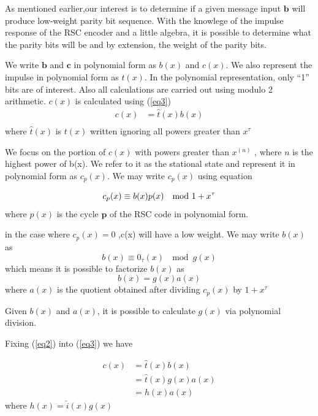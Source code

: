 \documentclass[conference]{IEEEtran}
\begin{document}
As mentioned earlier,our interest is to determine if a given message input $\textbf{b}$ will produce low-weight parity bit sequence. With the knowlege of the impulse response of the  RSC encoder and a little algebra, it is possible to determine what the parity bits will be and by extension, the weight of the parity bits. 
 
 We write $\textbf{b}$ and $\textbf{c}$ in polynomial form as $b(x)$ and $c(x)$. We also represent the impulse in polynomial form as $t(x)$. In the polynomial representation, only ``1'' bits are of interest. Also all calculations are carried out using modulo 2 arithmetic.
$c(x)$ is calculated using (\ref{eq3})
 \begin{equation}
 \begin{split}
 c(x)&=\hat{t}(x)b(x)\\
 \end{split}
 \label{eq3}
 \end{equation}
 where $\hat{t}(x)$ is $t(x)$ written ignoring all powers greater than $x^{\tau}$
 
 We focus on the portion of $c(x)$ with powers greater than $x^{(n)}$ , where $n$ is the highest power of b(x). We refer to it as the stational state and represent it in polynomial form as $c_p(x)$.  We may write $c_p(x)$ using equation 

 \begin{equation}
 c_p(x)  \equiv b(x)p(x) ~\mod{ 1+ x^{\tau}}\\
 \label{eq1}
 \end{equation}
where $p(x)$ is the cycle $\textbf{p}$ of the  RSC code in polynomial form.
 
 in the case where $c_p(x) = 0$ ,c(x) will have a low weight.  We may write $b(x)$ as 
 $$b(x) \equiv  0_{\tau}(x) ~\mod{ g(x)} $$ which means  it is possible to factorize $b(x)$ as 
 \begin{equation}
 b(x) =g(x)a(x)
 \label{eq2}
 \end{equation}
 where $a(x)$ is the quotient obtained after dividing $c_p(x)$ by $1+ x^{\tau}$
 
 Given $b(x)$ and $a(x)$, it is possible to calculate $g(x)$ via polynomial division.
 
 Fixing (\ref{eq2}) into (\ref{eq3}) we have 
 
 \begin{equation}
 \begin{split}
 c(x)&=\hat{t}(x)b(x)\\
 &=\hat{t}(x)g(x)a(x)\\
 & = h(x)a(x)
 \end{split}
 \label{eq4}
 \end{equation}
 where  $h(x)=\hat{i}(x)g(x)$ 
 
\end{document}

